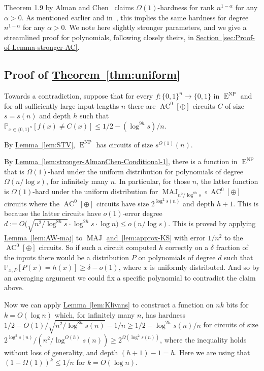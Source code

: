 \documentclass[11pt]{article}
\newcommand{\expref}[2]{\texorpdfstring{\hyperref[#2]{#1~\ref{#2}}}{#1~\ref{#2}}}
\DeclareMathOperator{\MAJ}{\mathrm{MAJ}}  %
\DeclareMathOperator{\AC}{\mathrm{AC}}  %
\DeclareMathOperator{\NP}{\mathrm{NP}}  %
\DeclareMathOperator{\EEE}{\mathrm{E}}  %
\newcommand{\zo}{\{0, 1\}}
\renewcommand{\P}{\mathbb{P}}
\begin{document}
Theorem 1.9 by Alman and Chen~\cite{AlmanC19} claims $\Omega(1)$-hardness
for rank $n^{1-\alpha}$ for any $\alpha>0$. As mentioned earlier
and in~\cite{ServedioV-sparse}, this implies the same hardness for
degree \emph{$n^{1-\alpha}$} for any $\alpha>0$. We note here slightly
stronger parameters, and we give a streamlined proof for polynomials,
following closely theirs, in \expref{Section}{sec:Proof-of-Lemma-stronger-AC}.

\subsection{Proof of \expref{Theorem}{thm:uniform}}

Towards a contradiction, suppose that for every $f:\zo^{n}\to\zo$
in $\EEE^{\NP}$ and for all sufficiently large input lengths $n$ there
are $\AC^{0}[\oplus]$ circuits $C$ of size $s=s(n)$ and depth $h$
such that $\P_{x\in\zo^{n}}[f(x)\ne C(x)]\le1/2-(\log^{9h}s)/n$.

By \expref{Lemma}{lem:STV}, $\EEE^{\NP}$ has circuits of size $s^{O(1)}(n)$.

By \expref{Lemma}{lem:stronger-AlmanChen-Conditional-1}, there is a function
in $\EEE^{\NP}$ that is $\Omega(1)$-hard under the uniform distribution
for polynomials of degree $\Omega(n/\log s)$, for infinitely many
$n$. In particular, for those $n$, the latter function is $\Omega(1)$-hard
under the uniform distribution for $\MAJ_{n^{2}/\log^{8h}s}\circ \AC^{0}[\oplus]$
circuits where the $\AC^{0}[\oplus]$ circuits have size $2^{\log^{2}s(n)}$
and depth $h+1$. This is because the latter circuits have $o(1)$-error
degree $d:=O(\sqrt{n^{2}/\log^{8h}s}\cdot\ensuremath{\log^{2h}s\cdot\log n)\le o(n/\log s)}$.
This is proved by applying \expref{Lemma}{lem:AW-maj} to $\MAJ$ \expref{and}{lem:approx-KS}
with error $1/n^{2}$ to the $\AC^{0}[\oplus]$ circuits. So if such
a circuit computed $h$ correctly on a $\delta$ fraction of the inputs
there would be a distribution $P$ on polynomials of degree $d$ such
that $\P_{x,P}[P(x)=h(x)]\ge\delta-o(1)$, where $x$ is uniformly
distributed. And so by an averaging argument we could fix a specific
polynomial to contradict the claim above.

Now we can apply \expref{Lemma}{lem:Klivans} to construct a function
on $nk$ bits for $k=O(\log n)$ which, for infinitely many $n$,
has hardness %
$1/2-O(1)\Big/\sqrt{n^{2}/\log^{8h}s(n)}-1/n\ge1/2-\log^{2h}s(n)/n$ %
for circuits of size $2^{\log^{2}s(n)}/(n^{2}/\log^{O(h)}s(n))\ge2^{\Omega(\log^{2}s(n))}$,
where the inequality holds without loss of generality, and depth $(h+1)-1=h$.
Here we are using that $(1-\Omega(1))^{k}\le1/n$ for $k=O(\log n)$.
\end{document}
